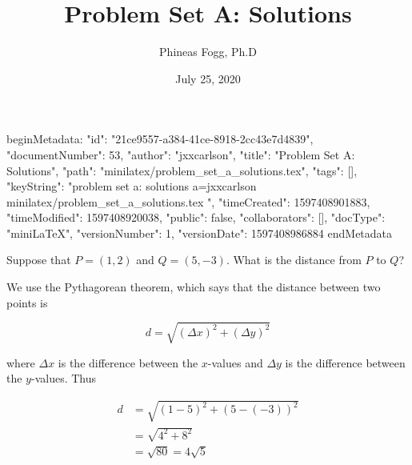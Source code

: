 beginMetadata:
{
    "id": "21ce9557-a384-41ce-8918-2cc43e7d4839",
    "documentNumber": 53,
    "author": "jxxcarlson",
    "title": "Problem Set A: Solutions",
    "path": "minilatex/problem_set_a_solutions.tex",
    "tags": [],
    "keyString": "problem set a: solutions a=jxxcarlson minilatex/problem_set_a_solutions.tex ",
    "timeCreated": 1597408901883,
    "timeModified": 1597408920038,
    "public": false,
    "collaborators": [],
    "docType": "miniLaTeX",
    "versionNumber": 1,
    "versionDate": 1597408986884
}
endMetadata

\title{Problem Set A: Solutions}
\author{Phineas Fogg, Ph.D}
\date{July 25, 2020}


\maketitle


\begin{problem}
Suppose that $P = (1,2)$ and $Q = (5,-3)$.  What is the distance from $P$ to $Q$?
\end{problem}

\begin{solution}
We use the Pythagorean theorem, which says that the distance between two points is

\begin{equation}
d = \sqrt{(\Delta x)^2 + (\Delta y)^2}
\end{equation}

where $\Delta x$ is the difference between the $x$-values and $\Delta y$ is the difference between the $y$-values.  Thus

\begin{align}
d &= \sqrt{(1 - 5)^2 + (5 - (-3))^2} \\
  &= \sqrt{4^2 + 8^2} \\
  &= \sqrt{80} = 4\sqrt{5}
\end{align}

\end{solution}

